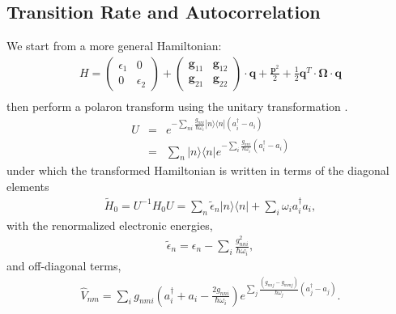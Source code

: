 \subsection{Transition Rate and Autocorrelation}
We start from a more general Hamiltonian:
\begin{eqnarray}
H=\left(\begin{array}{cc}
\epsilon_{1} & 0\\
0 & \epsilon_{2}
\end{array}\right)+\left(\begin{array}{cc}
{\mathbf g}_{11}&{\mathbf g}_{12} \\
{\mathbf g}_{21} &{\mathbf g}_{22}
\end{array}\right)\cdot{\mathbf q} +\frac{{\mathbf p}^{2}}{2}+\frac{1}{2}\mathbf{q}^{T}\cdot\mathbf\Omega\cdot\mathbf{q}
\nonumber \\
\end{eqnarray}
then perform a polaron transform
using the unitary transformation \cite{grover1970exciton,rice1994excitons,pereverzev2006time}.
\begin{eqnarray}
U&=&e^{-\sum_{ni}\!\!\frac{g_{nni}}{\hbar\omega_i}|n\rangle \langle
n|(a^{\dagger}_i-a_i)}
 \nonumber \\
&=&
\sum_{n}|n\rangle \langle n|e^{-\sum_{i}\!\!\frac{g_{nni}}{\hbar\omega_i}(a^{\dagger}_i-a_i)}
\end{eqnarray}
under which the transformed Hamiltonian is written in terms of the
diagonal elements
\begin{eqnarray} \tilde H_0=U^{-1}H_0U
=\sum_n\tilde\epsilon_n |n\rangle \langle
n|+\sum_i\omega_ia^{\dagger}_ia_i,
 \end{eqnarray}
with  the renormalized electronic energies,
\begin{eqnarray}
\tilde\epsilon_n=\epsilon_n-\sum_{i}\frac{g_{nni}^2}{\hbar\omega_i},
\end{eqnarray}
and off-diagonal terms,
\begin{eqnarray} \hat V_{nm}=\sum_{i}g_{nmi}\left(a^{\dagger}_i+
a_i-\frac{2g_{nni}}{\hbar\omega_i}\right)e^{\sum_{j}\frac{(g_{nnj}-g_{mmj})}{\hbar\omega_j}(a^{\dagger}_j-a_j)}.
\end{eqnarray}
